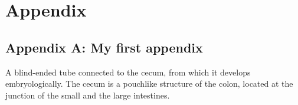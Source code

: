 
\chapter{Appendix}

\section{Appendix A: My first appendix}
\label{app: }

A blind-ended tube connected to the cecum, from which it develops embryologically. The cecum is a pouchlike structure of the colon, located at the junction of the small and the large intestines.
